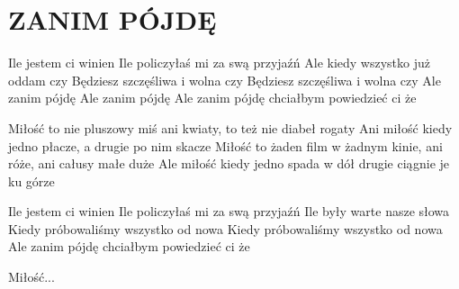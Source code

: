 \documentclass[../../../songbook.tex]{subfiles}
\begin{document}
\TabPositions{8cm} %
\section*{ZANIM PÓJDĘ}
{}
\vspace{0.5cm}

Ile jestem ci winien				    \newline
Ile policzyłaś mi za swą przyjaźń			\newline
Ale kiedy wszystko już oddam czy 			\newline
Będziesz szczęśliwa i wolna czy 			\newline
Będziesz szczęśliwa i wolna czy 			\newline
Ale zanim pójdę 					        \newline
Ale zanim pójdę 					        \newline
Ale zanim pójdę chciałbym powiedzieć ci że	\newline	  

\-\hspace{1cm} Miłość to nie pluszowy miś		\newline
\-\hspace{1cm} ani kwiaty, to też nie diabeł rogaty \newline
\-\hspace{1cm} Ani miłość kiedy jedno płacze,		\newline
\-\hspace{1cm} a drugie po nim skacze				\newline
\-\hspace{1cm} Miłość to żaden film w żadnym kinie, \newline
\-\hspace{1cm} ani róże, ani całusy małe duże 		\newline
\-\hspace{1cm} Ale miłość kiedy jedno spada w dół   \newline
\-\hspace{1cm} drugie ciągnie je ku górze  			\newline      

Ile jestem ci winien                        \newline
Ile policzyłaś mi za swą przyjaźń           \newline
Ile były warte nasze słowa                  \newline
Kiedy próbowaliśmy wszystko od nowa         \newline
Kiedy próbowaliśmy wszystko od nowa         \newline
Ale zanim pójdę chciałbym powiedzieć ci że  \newline

\-\hspace{1cm} Miłość...
\end{document}
